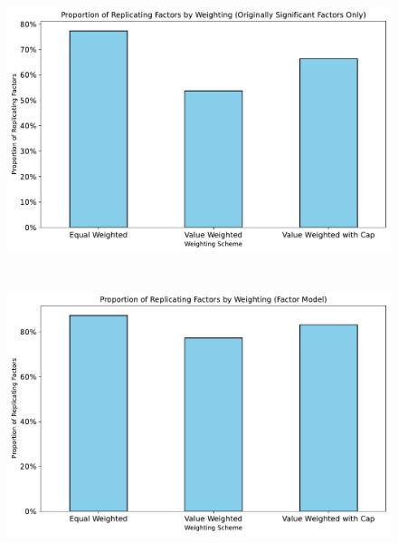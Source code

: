 \documentclass[hidelinks,12pt]{article}
\begin{document}
\FloatBarrier

\section{}
\begin{figure}[htbp]
    \centering
    \includegraphics[width=.95\textwidth]{out/2.pdf}
\end{figure}

\FloatBarrier

\section{}
\begin{figure}[htbp]
    \centering
    \includegraphics[width=.95\textwidth]{out/3.pdf}
\end{figure}

\FloatBarrier
\end{document}

